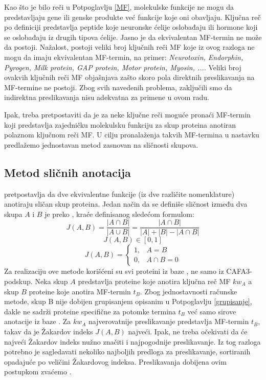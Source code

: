 Kao što je bilo reči u Potpoglavlju \ref{MF}, molekulske funkcije ne mogu da
predstavljaju gene ili genske produkte već funkcije koje oni obavljaju. Ključna
reč  po definiciji predstavlja peptide koje neuronske
ćelije oslobađaju ili hormone koji se oslobađaju iz drugih tipova ćelije. Jasno
je da ekvivalentan MF-termin ne može da postoji.  Nažalost, postoji veliki broj
ključnih reči MF koje iz ovog razloga ne mogu da imaju ekvivalentan MF-termin,
na primer: \textit{ Neurotoxin, Endorphin, Pyrogen, Milk protein, GAP protein,
Motor protein, Myosin, ...}. Veliki broj ovakvih ključnih reči MF objašnjava 
zašto skoro pola direktnih preslikavanja na MF-termine ne postoji.  Zbog svih
navedenih problema, zaključili smo da indirektna preslikavanja nisu adekvatna za
primene u ovom radu.

Ipak, treba pretpostaviti da je za neke ključne reči moguće pronaći MF-termin
koji predstavlja zajedničku molekulsku funkciju za skup proteina anotiran
polaznom ključnom reči MF.  U cilju pronalaženja takvih MF-termina u nastavku
predlažemo jednostavan metod zasnovan na sličnosti skupova.

\subsection{Metod sličnih anotacija}

 pretpostavlja da dve ekvivalentne funkcije (iz dve
različite nomenklature) anotiraju sličan skup proteina.  Jedan način da se
definiše sličnost između dva skupa $A$ i $B$ je preko 
, kraće   definisanog sledećom formulom:
$$J(A,B) = \dfrac{|A \cap B|}{|A \cup B|} =  \dfrac{|A \cap B|}{|A|+|B|-|A \cap B|}$$
$$  J(A,B) \in [0, 1] $$
\[   
  J(A,B) = 
    \begin{cases}
      1,&A=B  \\
      0,&A\cap B=0
    \end{cases}
\]
Za realizaciju ove metode korišćeni su svi proteini iz baze \swissprot, ne samo iz
CAFA3-podskup.  Neka skup $A$ predstavlja proteine koje anotira ključna reč MF $kw_A$
a skup $B$ proteine koje anotira MF-termin $t_B$.  Zbog jednostavnosti računske
metode, skup B nije dobijen grupisanjem opisanim u Potpoglavlju
\ref{grupisanje}, dakle ne sadrži proteine specifične za potomke termina $t_B$
već samo sirove anotacije iz baze \swissprot.  Za $kw_A$ najverovatnije
preslikavanje predstavlja MF-termin $t_B$, takav da je Žakardov indeks $J(A,B)$
najveći.  Ipak, ne treba očekivati da će najveći Žakardov indeks nužno značiti
i najpogodnije preslikavanje. Iz tog razloga potrebno je  sagledavati nekoliko
najboljih predloga za preslikavanje, sortiranih opadajuće po veličini
Žakardovog indeksa. Preslikavanja dobijena ovim postupkom zvaćemo
.

